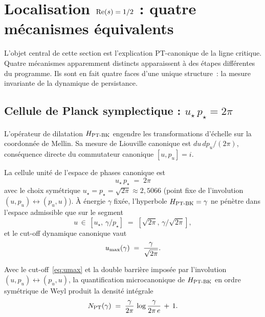 \section{Localisation $\operatorname{Re}(s) = 1/2$ : quatre mécanismes équivalents}
\label{sec:localisation_critique}

L'objet central de cette section est l'explication PT-canonique de la
ligne critique. Quatre mécanismes apparemment distincts apparaissent à des
étapes différentes du programme. Ils sont en fait quatre faces d'une
unique structure~: la mesure invariante de la dynamique de persistance.

\subsection{Cellule de Planck symplectique : $u_\star\,p_\star = 2\pi$}
\label{sec:cellule_planck}

L'opérateur de dilatation $H_{\mathrm{PT\text{-}BK}}$ engendre les transformations d'échelle
sur la coordonnée de Mellin. Sa mesure de Liouville canonique est
$du\,dp_u / (2\pi)$, conséquence directe du commutateur canonique
$[u, p_u] = i$.

\begin{proposition}
\label{prop:cellule_planck}
La cellule unité de l'espace de phases canonique est
\begin{equation}
\boxed{\;u_\star\, p_\star \;=\; 2\pi\;}
\label{eq:cellule_planck}
\end{equation}
avec le choix symétrique
$u_\star = p_\star = \sqrt{2\pi} \approx 2{,}5066$ (point fixe de
l'involution $(u, p_u) \leftrightarrow (p_u, u)$). À énergie $\gamma$
fixée, l'hyperbole $H_{\mathrm{PT\text{-}BK}} = \gamma$ ne pénètre dans l'espace admissible
que sur le segment
\[
u \,\in\, [u_\star,\, \gamma/p_\star] \;=\; [\sqrt{2\pi},\, \gamma/\sqrt{2\pi}],
\]
et le cut-off dynamique canonique vaut
\begin{equation}
u_{\max}(\gamma) \;=\; \dfrac{\gamma}{\sqrt{2\pi}}.
\label{eq:umax}
\end{equation}
\end{proposition}

\begin{proposition}
\label{prop:densite_NPT}
Avec le cut-off~\eqref{eq:umax} et la double barrière imposée par
l'involution $(u, p_u) \leftrightarrow (p_u, u)$, la quantification
microcanonique de $H_{\mathrm{PT\text{-}BK}}$ en ordre symétrique de Weyl produit la densité
intégrale
\begin{equation}
N_{\mathrm{PT}}(\gamma) \;=\; \dfrac{\gamma}{2\pi}\,\log\dfrac{\gamma}{2\pi\,e} \,+\, 1.
\label{eq:NPT}
\end{equation}
\end{proposition}
\label{sec:densite_semi_classique}

